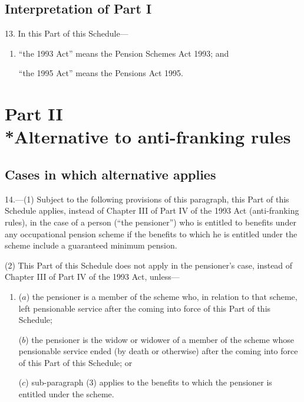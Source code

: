 \documentclass[12pt,a4paper]{article}
\begin{document}
\subsection*{Interpretation of Part I}

13. In this Part of this Schedule—
\begin{enumerate}\item[]
    “the 1993 Act” means the Pension Schemes Act 1993; and

    “the 1995 Act” means the Pensions Act 1995.  
\end{enumerate}

\section[Part II --- Alternative to anti-franking rules]{Part II\\*Alternative to anti-franking rules}

\renewcommand\parthead{--- Schedule 5 Part II}


\subsection*{Cases in which alternative applies}

14.---(1) Subject to the following provisions of this paragraph, this Part of this Schedule applies, instead of Chapter III of Part IV of the 1993 Act (anti-franking rules), in the case of a person (“the pensioner”) who is entitled to benefits under any occupational pension scheme if the benefits to which he is entitled under the scheme include a guaranteed minimum pension.

(2) This Part of this Schedule does not apply in the pensioner’s case, instead of Chapter III of Part IV of the 1993 Act, unless—
\begin{enumerate}\item[]
($a$) the pensioner is a member of the scheme who, in relation to that scheme, left pensionable service after the coming into force of this Part of this Schedule;

($b$) the pensioner is the widow or widower of a member of the scheme whose pensionable service ended (by death or otherwise) after the coming into force of this Part of this Schedule; or

($c$) sub-paragraph (3)  applies to the benefits to which the pensioner is entitled under the scheme.
\end{enumerate}
\end{document}
